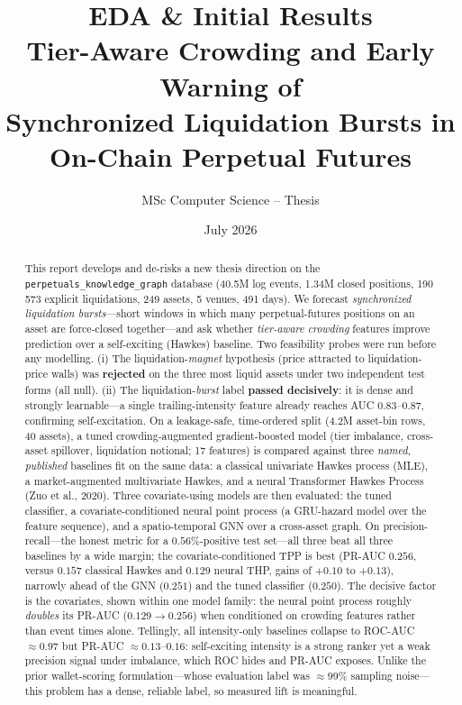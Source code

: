 \documentclass[11pt,a4paper]{article}
\title{\textbf{EDA \& Initial Results}\\%
       \large Tier-Aware Crowding and Early Warning of\\
       Synchronized Liquidation Bursts in On-Chain Perpetual Futures}
\author{MSc Computer Science -- Thesis}
\date{July 2026}
\begin{document}
\maketitle

\begin{abstract}
This report develops and de-risks a new thesis direction on the \texttt{perpetuals\_knowledge\_graph} database (40.5M log events, 1.34M closed positions, 190\,573 explicit liquidations, 249 assets, 5 venues, 491 days). We forecast \emph{synchronized liquidation bursts}---short windows in which many perpetual-futures positions on an asset are force-closed together---and ask whether \emph{tier-aware crowding} features improve prediction over a self-exciting (Hawkes) baseline. Two feasibility probes were run before any modelling. (i) The liquidation-\emph{magnet} hypothesis (price attracted to liquidation-price walls) was \textbf{rejected} on the three most liquid assets under two independent test forms (all null). (ii) The liquidation-\emph{burst} label \textbf{passed decisively}: it is dense and strongly learnable---a single trailing-intensity feature already reaches AUC $0.83$--$0.87$, confirming self-excitation. On a leakage-safe, time-ordered split (4.2M asset-bin rows, 40 assets), a tuned crowding-augmented gradient-boosted model (tier imbalance, cross-asset spillover, liquidation notional; 17 features) is compared against three \emph{named, published} baselines fit on the same data: a classical univariate Hawkes process (MLE), a market-augmented multivariate Hawkes, and a neural Transformer Hawkes Process (Zuo et al., 2020). Three covariate-using models are then evaluated: the tuned classifier, a covariate-conditioned neural point process (a GRU-hazard model over the feature sequence), and a spatio-temporal GNN over a cross-asset graph. On precision-recall---the honest metric for a $0.56\%$-positive test set---all three beat all three baselines by a wide margin; the covariate-conditioned TPP is best (PR-AUC $0.256$, versus $0.157$ classical Hawkes and $0.129$ neural THP, gains of $+0.10$ to $+0.13$), narrowly ahead of the GNN ($0.251$) and the tuned classifier ($0.250$). The decisive factor is the covariates, shown within one model family: the neural point process roughly \emph{doubles} its PR-AUC ($0.129\to0.256$) when conditioned on crowding features rather than event times alone. Tellingly, all intensity-only baselines collapse to ROC-AUC $\approx 0.97$ but PR-AUC $\approx 0.13$--$0.16$: self-exciting intensity is a strong ranker yet a weak precision signal under imbalance, which ROC hides and PR-AUC exposes. Unlike the prior wallet-scoring formulation---whose evaluation label was $\approx99\%$ sampling noise---this problem has a dense, reliable label, so measured lift is meaningful.
\end{abstract}
\end{document}
